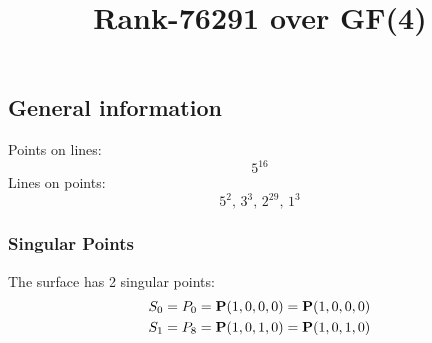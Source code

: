 \documentclass{article}
\newcommand\setTBstruts{\def\T{\rule{0pt}{2.6ex}}%
\def\B{\rule[-1.2ex]{0pt}{0pt}}}
\newcommand{\bP}{{\bf P}}
\begin{document}
 
\setTBstruts



{\allowdisplaybreaks%






\title{Rank-76291 over GF(4)}
\author{}%
\maketitle%
%
{}



\subsection*{General information}
Points on lines:
$$
5^{16}$$
Lines on points:
$$
5^2,\,3^3,\,2^{29},\,1^3$$
\subsubsection*{Singular Points}
The surface has 2 singular points:\\
\begin{align*}
S_{0} &= P_{0}=\bP(1, 0, 0, 0) = \bP(1, 0, 0, 0)\\
S_{1} &= P_{8}=\bP(1, 0, 1, 0) = \bP(1, 0, 1, 0)\\
\end{align*}
}
\end{document}
